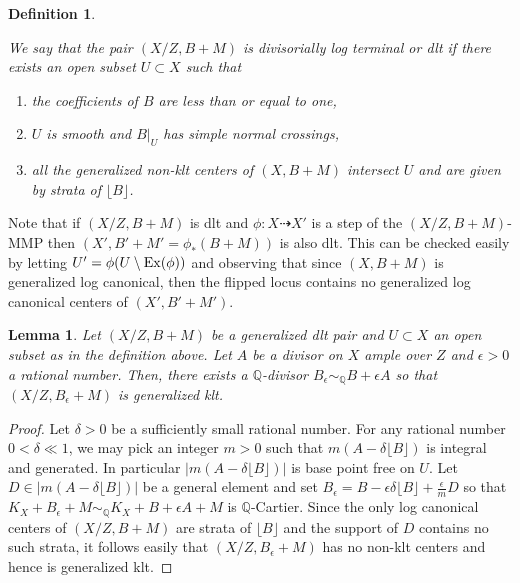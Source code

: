 \documentclass{amsart}
\newcommand{\Q}{\mathbb{Q}}
\renewcommand{\qq}{\mathbb{Q}}
\newtheorem{lemma}[theorem]{Lemma}
\newtheorem{definition}[theorem]{Definition}
\theoremstyle{remark}
\numberwithin{equation}{section}
\begin{document}
\begin{definition}\label{d-dlt}
{\em 
We say that the pair $(X/Z,B+M)$ is {\em divisorially log terminal} or {\em dlt} if there exists an open subset $U\subset X$ such that
\begin{enumerate}
\item the coefficients of $B$ are less than or equal to one, 
\item $U$ is smooth and $B|_U$ has simple normal crossings, 
\item all the generalized non-klt centers of $(X,B+M)$ intersect $U$ and are given by strata of $\lfloor B\rfloor$.
\end{enumerate}
}
\end{definition}
Note that if $(X/Z,B+M)$  is dlt and $\phi: X\dasharrow X'$ is a step of the $(X/Z,B+M)$-MMP then $(X',B'+M'=\phi _*(B+M))$ is also dlt.
This can be checked easily by letting $U'=\phi(U\setminus {\rm Ex}(\phi))$ and observing that since $(X,B+M)$ is generalized log canonical, then the flipped locus contains no generalized log canonical centers of $(X',B'+M')$.

\begin{lemma}\label{dlt-perturbation}
Let $(X/Z,B+M)$ be a generalized dlt pair and $U\subset X$ an open subset as in the definition above.
Let $A$ be a divisor on $X$ ample over $Z$ and $\epsilon >0$ a rational number. 
Then, there exists a $\qq$-divisor $B_\epsilon \sim_\qq B+\epsilon A$ so that $(X/Z,B_\epsilon+M)$ is generalized klt.
\end{lemma}

\begin{proof}
Let $\delta>0$ be a sufficiently small rational number.
For any rational  number $0<\delta \ll 1$, we may pick an integer $m>0$ such that $m(A-\delta \lfloor B\rfloor)$ is integral and generated. In particular $| m(A-\delta \lfloor B\rfloor)|$ is base point free on $U$. Let $D\in | m(A-\delta \lfloor B\rfloor)|$ be a general element and set $B_\epsilon =B-\epsilon \delta \lfloor B\rfloor +\frac \epsilon m D$ so that $K_X+B_\epsilon+M\sim _\Q K_X+B+\epsilon A +M$ is $\Q$-Cartier. Since 
the only log canonical centers of $(X/Z,B+M)$ are strata of $\lfloor B\rfloor$ and the support of $D$ contains no such strata, it follows easily that $(X/Z,B_\epsilon+M)$ has no non-klt centers and hence is generalized klt.
\end{proof}
\end{document}
